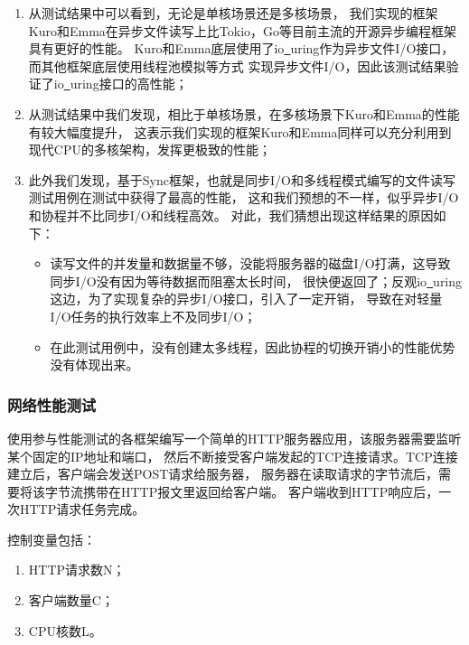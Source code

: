 \documentclass[supercite]{HustGraduPaper}
\theoremstyle{definition}
\begin{document}
\begin{enumerate}
  \item 从测试结果中可以看到，无论是单核场景还是多核场景，
    我们实现的框架Kuro和Emma在异步文件读写上比Tokio，Go等目前主流的开源异步编程框架具有更好的性能。
    Kuro和Emma底层使用了io\underline{~}uring作为异步文件I/O接口，而其他框架底层使用线程池模拟等方式
    实现异步文件I/O，因此该测试结果验证了io\underline{~}uring接口的高性能；
  \item 从测试结果中我们发现，相比于单核场景，在多核场景下Kuro和Emma的性能有较大幅度提升，
    这表示我们实现的框架Kuro和Emma同样可以充分利用到现代CPU的多核架构，发挥更极致的性能；
  \item 此外我们发现，基于Sync框架，也就是同步I/O和多线程模式编写的文件读写测试用例在测试中获得了最高的性能，
    这和我们预想的不一样，似乎异步I/O和协程并不比同步I/O和线程高效。
    对此，我们猜想出现这样结果的原因如下：
    \begin{itemize}
      \item 读写文件的并发量和数据量不够，没能将服务器的磁盘I/O打满，这导致同步I/O没有因为等待数据而阻塞太长时间，
        很快便返回了；反观io\underline{~}uring这边，为了实现复杂的异步I/O接口，引入了一定开销，
        导致在对轻量I/O任务的执行效率上不及同步I/O；
      \item 在此测试用例中，没有创建太多线程，因此协程的切换开销小的性能优势没有体现出来。
    \end{itemize}
\end{enumerate}

\subsubsection{网络性能测试}


使用参与性能测试的各框架编写一个简单的HTTP服务器应用，该服务器需要监听某个固定的IP地址和端口，
然后不断接受客户端发起的TCP连接请求。TCP连接建立后，客户端会发送POST请求给服务器，
服务器在读取请求的字节流后，需要将该字节流携带在HTTP报文里返回给客户端。
客户端收到HTTP响应后，一次HTTP请求任务完成。\par

控制变量包括：

\begin{enumerate}
  \item HTTP请求数N；
  \item 客户端数量C；
  \item CPU核数L。
\end{enumerate}
\end{document}
